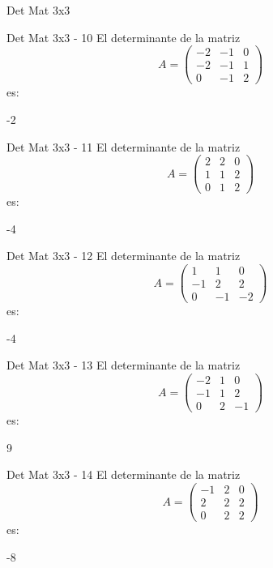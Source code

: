 \documentclass[a4,11pt]{aleph-notas}
\begin{document}
\begin{quiz}{Det Mat 3x3}
\begin{numerical}[tolerance=0]%
    {Det Mat 3x3 - 10}
    El determinante de la matriz
    \[
        A = \begin{pmatrix} -2 & -1 & 0 \\ -2 & -1 & 1 \\ 0 & -1 & 2 \end{pmatrix}
    \]
    es:
    \item[] -2
\end{numerical}

\begin{numerical}[tolerance=0]%
    {Det Mat 3x3 - 11}
    El determinante de la matriz
    \[
        A = \begin{pmatrix} 2 & 2 & 0 \\ 1 & 1 & 2 \\ 0 & 1 & 2 \end{pmatrix}
    \]
    es:
    \item[] -4
\end{numerical}

\begin{numerical}[tolerance=0]%
    {Det Mat 3x3 - 12}
    El determinante de la matriz
    \[
        A = \begin{pmatrix} 1 & 1 & 0 \\ -1 & 2 & 2 \\ 0 & -1 & -2 \end{pmatrix}
    \]
    es:
    \item[] -4
\end{numerical}

\begin{numerical}[tolerance=0]%
    {Det Mat 3x3 - 13}
    El determinante de la matriz
    \[
        A = \begin{pmatrix} -2 & 1 & 0 \\ -1 & 1 & 2 \\ 0 & 2 & -1 \end{pmatrix}
    \]
    es:
    \item[] 9
\end{numerical}

\begin{numerical}[tolerance=0]%
    {Det Mat 3x3 - 14}
    El determinante de la matriz
    \[
        A = \begin{pmatrix} -1 & 2 & 0 \\ 2 & 2 & 2 \\ 0 & 2 & 2 \end{pmatrix}
    \]
    es:
    \item[] -8
\end{numerical}


\end{quiz}
\end{document}
